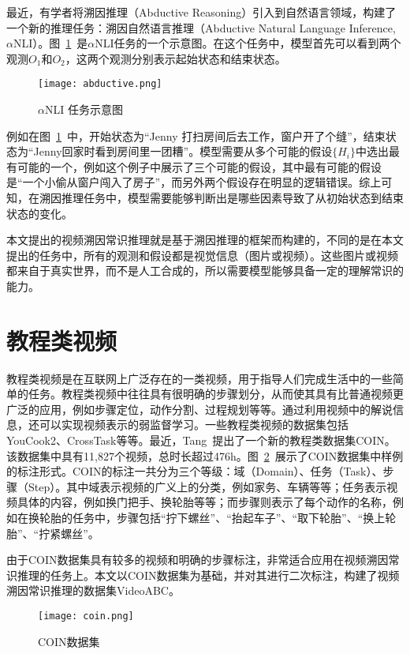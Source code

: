 最近，有学者将溯因推理（Abductive Reasoning）引入到自然语言领域，构建了一个新的推理任务：溯因自然语言推理\cite{bhagavatula2019abductive}（Abductive Natural Language Inference, $\alpha$NLI）。图~\ref{fig:aNLI}~是$\alpha$NLI任务的一个示意图。在这个任务中，模型首先可以看到两个观测$O_1$和$O_2$，这两个观测分别表示起始状态和结束状态。
\begin{figure}[!h]
    \centering
    \texttt{[image: abductive.png]}
    \caption{$\alpha$NLI 任务示意图}
    \label{fig:aNLI}
\end{figure}
例如在图~\ref{fig:aNLI}~中，开始状态为“Jenny 打扫房间后去工作，窗户开了个缝”，结束状态为“Jenny回家时看到房间里一团糟”。模型需要从多个可能的假设$\{H_i\}$中选出最有可能的一个，例如这个例子中展示了三个可能的假设，其中最有可能的假设是“一个小偷从窗户闯入了房子”，而另外两个假设存在明显的逻辑错误。综上可知，在溯因推理任务中，模型需要能够判断出是哪些因素导致了从初始状态到结束状态的变化。

本文提出的视频溯因常识推理就是基于溯因推理的框架而构建的，不同的是在本文提出的任务中，所有的观测和假设都是视觉信息（图片或视频）。这些图片或视频都来自于真实世界，而不是人工合成的，所以需要模型能够具备一定的理解常识的能力。
\section{教程类视频}
教程类视频是在互联网上广泛存在的一类视频，用于指导人们完成生活中的一些简单的任务。教程类视频中往往具有很明确的步骤划分，从而使其具有比普通视频更广泛的应用，例如步骤定位，动作分割、过程规划等等。通过利用视频中的解说信息，还可以实现视频表示的弱监督学习\cite{miech2019end}。一些教程类视频的数据集包括YouCook2\cite{zhou2018towards}、CrossTask\cite{zhukov2019cross}等等。最近，Tang~\etal\cite{tang2019coin}提出了一个新的教程类数据集COIN。该数据集中具有11,827个视频，总时长超过476h。图~\ref{fig:coin}~展示了COIN数据集中样例的标注形式。COIN的标注一共分为三个等级：域（Domain）、任务（Task）、步骤（Step）。其中域表示视频的广义上的分类，例如家务、车辆等等；任务表示视频具体的内容，例如换门把手、换轮胎等等；而步骤则表示了每个动作的名称，例如在换轮胎的任务中，步骤包括“拧下螺丝”、“抬起车子”、“取下轮胎”、“换上轮胎”、“拧紧螺丝”。

由于COIN数据集具有较多的视频和明确的步骤标注，非常适合应用在视频溯因常识推理的任务上。本文以COIN数据集为基础，并对其进行二次标注，构建了视频溯因常识推理的数据集VideoABC。

\begin{figure}[!h]
    \centering
    \texttt{[image: coin.png]}
    \caption{COIN数据集}
    \label{fig:coin}
\end{figure}
